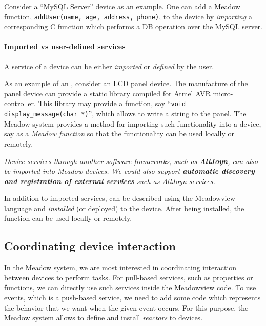 \documentclass{note}
\begin{document}
Consider a ``MySQL Server'' device as an example. One can add
a Meadow function, \textcolor{red2}{\texttt{addUser(name, age, address,
    phone)}}, to the device by \textcolor{blue2}{\em importing\/} a
corresponding C function which performs a DB operation over the MySQL server.


\paragraph{Imported vs user-defined services}
A service of a device can be either {\em imported\/}  or {\em defined\/} by
the user. 

As an example of an \textcolor{blue2}{}, consider an LCD
panel device. The manufacture of the panel device can provide a static library 
compiled for Atmel AVR micro-controller.
This library may provide a function, say
``\textcolor{red2}{\texttt{void display\_message(char *)}}'', which allows to 
write a string to the panel. The Meadow system provides a method for importing
such functionality into a device, say as a {\em Meadow function\/} so that 
the functionality can be used locally or remotely.

\textcolor{blue2}{\em Device services through another software frameworks,
  such as {\bf\em AllJoyn}, can also be imported into Meadow devices.
We could also support {\bf\em automatic discovery and registration of
external services\/} such as AllJoyn services.}


In addition to imported services, \textcolor{blue2}{} can be described using the {Meadowview  language} and {\em
  installed\/} (or deployed) to the device. After being installed, the
function can be used locally or remotely.


\subsection{Coordinating device interaction}
In the Meadow system, we are most interested in coordinating interaction
between devices to perform tasks.
For pull-based services, such as properties or functions, we can 
directly use such services inside the Meadowview code. To use events, which 
is a push-based service, we need to add some code which represents the
behavior that we want when the given event occurs.
For this purpose, the Meadow system allows to define and install {\em
  reactors\/} to devices.
\end{document}
